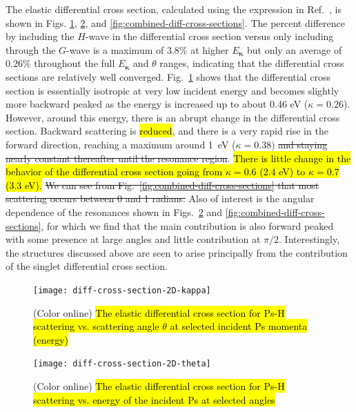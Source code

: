 \documentclass[preprint,showpacs,showkeys,preprintnumbers,amsmath,amssymb,longbibliography,pra,aps]{revtex4-1}
\newcommand{\todoi}{\todo[inline]}
\begin{document}
{The elastic differential cross section, calculated using the expression in
Ref.~\cite{Bransden2003}, is shown in Figs.
\ref{fig:diff-cross-section-2D-kappa}, \ref{fig:diff-cross-section-2D-theta},
and \ref{fig:combined-diff-cross-sections}. The percent difference by including
the $H$-wave in the differential cross section versus only including through
the $G$-wave is a maximum of $3.8\%$ at higher $E_{\bm \kappa}$
but only an average of $0.26\%$ throughout the full
$E_{\bm \kappa}$ and $\theta$ ranges, indicating that the differential cross sections
are relatively well converged. Fig.~\ref{fig:diff-cross-section-2D-kappa} shows
that the differential cross section is essentially
isotropic at very low incident energy and becomes slightly more backward peaked 
as the energy is increased up to about 0.46 eV ($\kappa = 0.26$). 
However, around this energy, there is an abrupt change in the differential 
cross section. Backward scattering is \hl{reduced}, and there is a very rapid
rise in the forward direction, reaching a maximum 
around 1~eV ($\kappa = 0.38)$ \sout{and staying nearly constant thereafter until
the resonance region}.
\hl{There is little change in the behavior of the differential cross section
going from $\kappa = 0.6$ (2.4 eV) to $\kappa = 0.7$ (3.3 eV).}
\sout{We can see from Fig.~\ref{fig:combined-diff-cross-sections}
that most scattering occurs between 0 and 1
radians.} Also of interest is the angular dependence of the resonances shown in
Figs.~\ref{fig:diff-cross-section-2D-theta} and 
\ref{fig:combined-diff-cross-sections}, for which we find that the main 
contribution is also forward peaked with some presence at large angles and 
little contribution at $\pi/2$.
Interestingly, the structures discussed above are seen to arise principally
from the contribution of the singlet differential cross section.

\begin{figure}[H]
	\centering
	\texttt{[image: diff-cross-section-2D-kappa]}
	\caption{(Color online) \hl{The elastic differential cross section for Ps-H
scattering vs. scattering angle $\theta$ at selected incident Ps momenta (energy)}}
	\label{fig:diff-cross-section-2D-kappa}
\end{figure}

\todoi{Try to distinguish lines more}

\begin{figure}[H]
	\centering
	\texttt{[image: diff-cross-section-2D-theta]}
	\caption{(Color online) \hl{The elastic differential cross section for Ps-H
scattering vs. energy of the incident Ps at selected angles}}
	\label{fig:diff-cross-section-2D-theta}
\end{figure}

}
\end{document}
